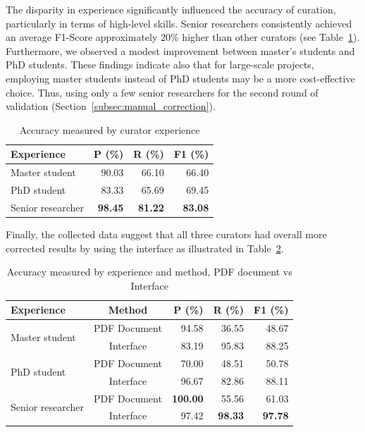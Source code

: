 \documentclass[a4paper]{article}
\begin{document}
The disparity in experience significantly influenced the accuracy of curation, particularly in terms of high-level skills. Senior researchers consistently achieved an average F1-Score approximately 20\% higher than other curators (see Table~\ref{tab:accuracy-by-experience}). Furthermore, we observed a modest improvement between master's students and PhD students. These findings indicate also that for large-scale projects, employing master students instead of PhD students may be a more cost-effective choice. Thus, using only a few senior researchers for the second round of validation (Section~\ref{subsec:manual_correction}).

\begin{table}[h]
\centering
\begin{tabular}{lrrr}
\toprule
\textbf{Experience} & \textbf{P (\%)}   & \textbf{R (\%)}   & \textbf{F1 (\%)}  \\
\midrule
Master student      & 90.03             & 66.10             & 66.40             \\
PhD student         & 83.33             & 65.69             & 69.45             \\
Senior researcher   & \textbf{98.45}    & \textbf{81.22}    & \textbf{83.08}    \\
\bottomrule
\end{tabular}
\caption{Accuracy measured by curator experience}
\label{tab:accuracy-by-experience}
\end{table}

Finally, the collected data suggest that all three curators had overall more corrected results by using the interface as illustrated in Table~\ref{tab:accuracy-by-experience-method}. 

\begin{table}[h]
\centering
\begin{tabular}{lcrrr}
\toprule
\textbf{Experience} & \textbf{Method} & \textbf{P (\%)} & \textbf{R (\%)} & 
\textbf{F1 (\%)} \\
\midrule
\multirow{2}{*}{Master student} & PDF Document & 94.58 & 36.55 & 48.67 \\
 & Interface & 83.19 & 95.83 & 88.25 \\
\midrule
\multirow{2}{*}{PhD student} & PDF Document & 70.00 & 48.51 & 50.78 \\
 & Interface & 96.67 & 82.86 & 88.11 \\
\midrule
\multirow{2}{*}{Senior researcher} & PDF Document & \textbf{100.00} & 55.56 & 61.03 \\
 & Interface & 97.42 & \textbf{98.33} & \textbf{97.78} \\
\bottomrule
\end{tabular}
\caption{Accuracy measured by experience and method, PDF document vs Interface}
\label{tab:accuracy-by-experience-method}
\end{table}
\end{document}
